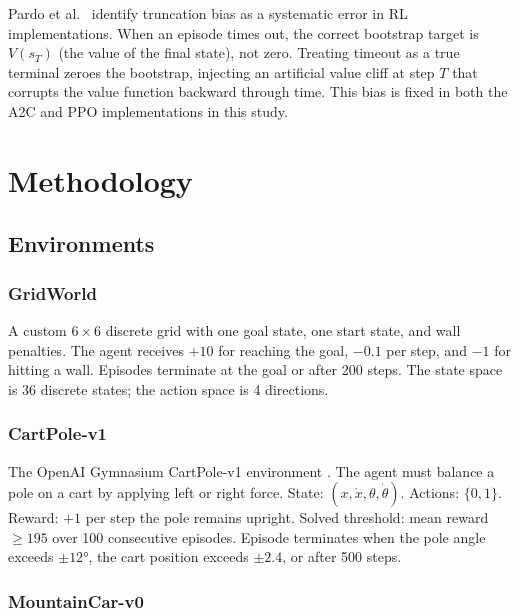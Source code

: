 \documentclass[a4paper,12pt]{article}
\begin{document}
Pardo et al.\ \cite{pardo2018time} identify truncation bias as a systematic error in RL implementations. When an episode times out, the correct bootstrap target is $V(s_T)$ (the value of the final state), not zero. Treating timeout as a true terminal zeroes the bootstrap, injecting an artificial value cliff at step $T$ that corrupts the value function backward through time. This bias is fixed in both the A2C and PPO implementations in this study.

\section{Methodology}
\label{sec:methodology}

\subsection{Environments}

\subsubsection{GridWorld}

A custom $6\times6$ discrete grid with one goal state, one start state, and wall penalties. The agent receives $+10$ for reaching the goal, $-0.1$ per step, and $-1$ for hitting a wall. Episodes terminate at the goal or after 200 steps. The state space is 36 discrete states; the action space is 4 directions.

\subsubsection{CartPole-v1}

The OpenAI Gymnasium CartPole-v1 environment \cite{brockman2016openai}. The agent must balance a pole on a cart by applying left or right force. State: $(x, \dot{x}, \theta, \dot{\theta})$. Actions: $\{0,1\}$. Reward: $+1$ per step the pole remains upright. Solved threshold: mean reward $\geq 195$ over 100 consecutive episodes. Episode terminates when the pole angle exceeds $\pm12°$, the cart position exceeds $\pm2.4$, or after 500 steps.

\subsubsection{MountainCar-v0}
\end{document}
